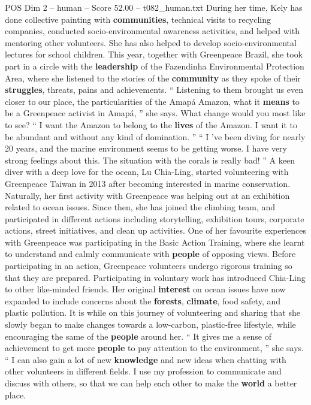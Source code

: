 \begin{textsample}{POS Dim 2 – human – Score 52.00 – t082\_human.txt}
During her time, Kely has done collective painting with \textbf{communities}, technical visits to recycling companies, conducted socio-environmental awareness activities, and helped with mentoring other volunteers.
She has also helped to develop socio-environmental lectures for school children.
This year, together with Greenpeace Brazil, she took part in a circle with the \textbf{leadership} of the Fazendinha Environmental Protection Area, where she listened to the stories of the \textbf{community} as they spoke of their \textbf{struggles}, threats, pains and achievements. “ Listening to them brought us even closer to our place, the particularities of the Amapá Amazon, what it \textbf{means} to be a Greenpeace activist in Amapá, ” she says.
What change would you most like to see? “ I want the Amazon to belong to the \textbf{lives} of the Amazon.
I want it to be abundant and without any kind of domination. ” “ I ’ve been diving for nearly 20 years, and the marine environment seems to be getting worse.
I have very strong feelings about this.
The situation with the corals is really bad! ” A keen diver with a deep love for the ocean, Lu Chia-Ling, started volunteering with Greenpeace Taiwan in 2013 after becoming interested in marine conservation.
Naturally, her first activity with Greenpeace was helping out at an exhibition related to ocean issues.
Since then, she has joined the climbing team, and participated in different actions including storytelling, exhibition tours, corporate actions, street initiatives, and clean up activities.
One of her favourite experiences with Greenpeace was participating in the Basic Action Training, where she learnt to understand and calmly communicate with \textbf{people} of opposing views.
Before participating in an action, Greenpeace volunteers undergo rigorous training so that they are prepared.
Participating in voluntary work has introduced Chia-Ling to other like-minded friends.
Her original \textbf{interest} on ocean issues have now expanded to include concerns about the \textbf{forests}, \textbf{climate}, food safety, and plastic pollution.
It is while on this journey of volunteering and sharing that she slowly began to make changes towards a low-carbon, plastic-free lifestyle, while encouraging the same of the \textbf{people} around her. “ It gives me a sense of achievement to get more \textbf{people} to pay attention to the environment, ” she says. “ I can also gain a lot of new \textbf{knowledge} and new ideas when chatting with other volunteers in different fields.
I use my profession to communicate and discuss with others, so that we can help each other to make the \textbf{world} a better place.

\end{textsample}
